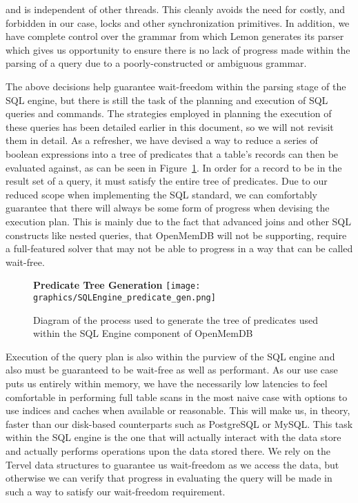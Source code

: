 \documentclass[letterpaper, 11pt]{article}
\begin{document}
  and is independent of other threads. This cleanly avoids the need for costly, and forbidden
  in our case, locks and other synchronization primitives. In addition, we have complete control over
  the grammar from which Lemon generates its parser which gives us opportunity to ensure there
  is no lack of progress made within the parsing of a query due to a poorly-constructed or ambiguous
  grammar.
  \par\vspace{\baselineskip}
  The above decisions help guarantee wait-freedom within the parsing stage of the SQL engine, but there
  is still the task of the planning and execution of SQL queries and commands. The strategies employed in
  planning the execution of these queries has been detailed earlier in this document, so we will not
  revisit them in detail. As a refresher, we have devised a way to reduce a series of boolean expressions
  into a tree of predicates that a table's records can then be evaluated against, as can be seen in 
  Figure~\ref{fig:sqlengine_pred_gen}. In order for a record to be in the result set of a query, it must 
  satisfy the entire tree of predicates. Due to our reduced scope when implementing the SQL standard, we 
  can comfortably guarantee that there will always be some form of progress when devising the execution 
  plan. This is mainly due to the fact that advanced joins and other SQL constructs like nested queries, 
  that OpenMemDB will not be supporting, require a full-featured solver that may not be able to progress 
  in a way that can be called wait-free.
  \par\vspace{\baselineskip}
  \begin{figure}[H]
   \centering
   \textbf{Predicate Tree Generation}
   \texttt{[image: graphics/SQLEngine\_predicate\_gen.png]}
   \caption{Diagram of the process used to generate the tree of predicates
	    used within the SQL Engine component of OpenMemDB}
    \label{fig:sqlengine_pred_gen}
  \end{figure}
  \par\vspace{\baselineskip}
  Execution of the query plan is also within the purview of the SQL engine and also must be guaranteed to be
  wait-free as well as performant. As our use case puts us entirely within memory, we have the necessarily low
  latencies to feel comfortable in performing full table scans in the most naive case with options to
  use indices and caches when available or reasonable. This will make us, in theory, faster than our disk-based
  counterparts such as PostgreSQL or MySQL. This task within the SQL engine is the one that will actually
  interact with the data store and actually performs operations upon the data stored there. We rely on the Tervel
  data structures to guarantee us wait-freedom as we access the data, but otherwise we can verify that
  progress in evaluating the query will be made in such a way to satisfy our wait-freedom requirement.
  \par\vspace{\baselineskip}
\end{document}
